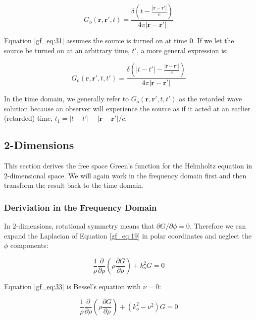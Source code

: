 \begin{equation}
\boxed{G_o\left(\mathbf{r},\mathbf{r}',t\right) = \frac{\delta\left(t-\frac{|\mathbf{r}-\mathbf{r}'|}{c} \right)}{4\pi |\mathbf{r}-\mathbf{r}'|}}
\label{gf_eq:31}
\end{equation}
\renewcommand{\baselinestretch}{2} \small\normalsize

Equation \ref{gf_eq:31} assumes the source is turned on at time $0$. If we let the source be turned on at an arbitrary time, $t'$, a more general expression is:

\begin{equation}
G_o\left(\mathbf{r},\mathbf{r}',t,t'\right) = \frac{\delta\left(|t-t'|-\frac{|\mathbf{r}-\mathbf{r}'|}{c} \right)}{4\pi |\mathbf{r}-\mathbf{r}'|}
\label{gf_eq:32}
\end{equation}
\renewcommand{\baselinestretch}{2} \small\normalsize

In the time domain, we generally refer to $G_o\left(\mathbf{r},\mathbf{r}',t, t'\right)$ as the retarded wave solution because an observer will experience the source as if it acted at an earlier (retarded) time, $t_1=|t-t'|-|\mathbf{r}-\mathbf{r}'|/c$.

\subsection {2-Dimensions}\label{gf_sec:2d}
This section derives the free space Green's function for the Helmholtz equation in 2-dimensional space. We will again work in the frequency domain first and then transform the result back to the time domain.

\subsubsection {Deriviation in the Frequency Domain}
In 2-dimensions,  rotational symmetry means that  $\partial G/\partial\phi =0$. Therefore we can expand the Laplacian of Equation \ref{gf_eq:19} in polar coordinates and neglect the $\phi$ components:

\begin{equation}
\frac{1}{\rho}\frac{\partial}{\partial \rho}\left(\rho\frac{\partial G}{\partial \rho}\right)+ k_o^2G = 0
\label{gf_eq:33}
\end{equation}
\renewcommand{\baselinestretch}{2} \small\normalsize

\noindent Equation \ref{gf_eq:33} is Bessel's equation with $\nu = 0$:

\begin{equation}
\frac{1}{\rho}\frac{\partial}{\partial \rho}\left(\rho\frac{\partial G}{\partial \rho}\right)+ \left(k_o^2 -\nu^2\right)G = 0
\label{gf_eq:34}
\end{equation}
\renewcommand{\baselinestretch}{2} \small\normalsize

